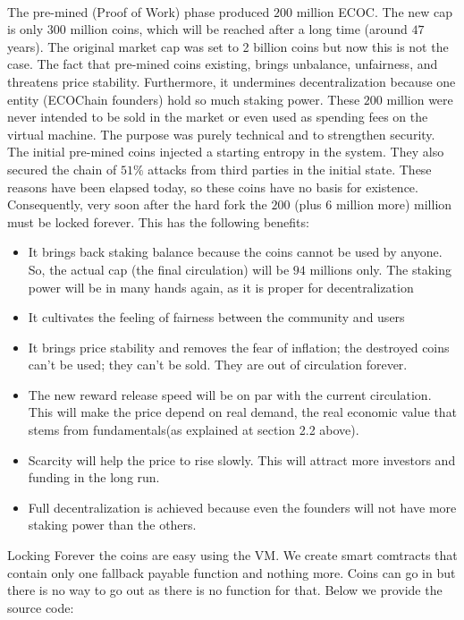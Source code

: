 \documentclass{article}
\begin{document}
\paragraph{}
The pre-mined (Proof of Work) phase produced $200$ million ECOC. The new cap is only $300$ million coins, which will be reached after a long time (around $47$ years). The original market cap was set to 2 billion coins but now this is not the case. The fact that pre-mined coins existing, brings unbalance, unfairness, and threatens price stability. Furthermore, it undermines decentralization because one entity (ECOChain founders) hold so much staking power.
These $200$ million were never intended to be sold in the market or even used as spending fees on the virtual machine. The purpose was purely technical and to strengthen security. The initial pre-mined coins injected a starting entropy in the system. They also secured the chain of $51\%$ attacks from third parties in the initial state. These reasons have been elapsed today, so these coins have no basis for existence. Consequently, very soon after the hard fork the $200$ (plus 6 million more)  million must be locked forever. This has the following benefits:
\begin{itemize}
\item It brings back staking balance because the coins cannot be used by anyone. So, the actual cap (the final circulation) will be $94$ millions only. The staking power will be in many hands again, as it is proper for decentralization
\item It cultivates the feeling of fairness between the community and users
\item It brings price stability and removes the fear of inflation; the destroyed coins can't be used; they can't be sold. They are out of circulation forever.
\item The new reward release speed will be on par with the current circulation. This will make the price depend on real demand, the real economic value that stems from fundamentals(as explained at section 2.2 above).
\item Scarcity will help the price to rise slowly. This will attract more investors and funding in the long run.
\item Full decentralization is achieved because even the founders will not have more staking power than the others.
\end{itemize}

Locking Forever the coins are easy using the VM. We create smart comtracts that contain 
only one fallback payable function and nothing more. Coins can go in but there is no way to go out as there is no function for that. Below we provide the source code:
\end{document}
